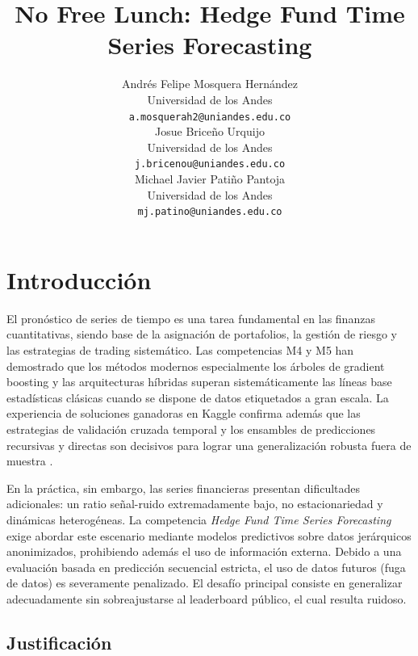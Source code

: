 \documentclass{article}
\title{No Free Lunch: Hedge Fund Time Series Forecasting}
\author{%
  Andrés Felipe Mosquera Hernández \\
  Universidad de los Andes \\
  \texttt{a.mosquerah2@uniandes.edu.co} \\
  \And
  Josue Briceño Urquijo \\
  Universidad de los Andes \\
  \texttt{j.bricenou@uniandes.edu.co} \\
  \And
  Michael Javier Patiño Pantoja \\
  Universidad de los Andes \\
  \texttt{mj.patino@uniandes.edu.co} \\
}
\begin{document}
\maketitle




\section{Introducción}

El pronóstico de series de tiempo es una tarea fundamental en las finanzas cuantitativas, siendo base de la asignación de portafolios, la gestión de riesgo y las estrategias de trading sistemático. Las competencias M4 \citep{makridakis2020m4} y M5 \citep{makridakis2022m5} han demostrado que los métodos modernos especialmente los árboles de gradient boosting \citep{ke2017lightgbm} y las arquitecturas híbridas superan sistemáticamente las líneas base estadísticas clásicas cuando se dispone de datos etiquetados a gran escala. La experiencia de soluciones ganadoras en Kaggle confirma además que las estrategias de validación cruzada temporal y los ensambles de predicciones recursivas y directas son decisivos para lograr una generalización robusta fuera de muestra \citep{m5first2020, kaggleguide}.

En la práctica, sin embargo, las series financieras presentan dificultades adicionales: un ratio señal-ruido extremadamente bajo, no estacionariedad y dinámicas heterogéneas. La competencia \emph{Hedge Fund Time Series Forecasting} \citep{adatacompany2026} exige abordar este escenario mediante modelos predictivos sobre datos jerárquicos anonimizados, prohibiendo además el uso de información externa. Debido a una evaluación basada en predicción secuencial estricta, el uso de datos futuros (fuga de datos) es severamente penalizado. El desafío principal consiste en generalizar adecuadamente sin sobreajustarse al leaderboard público, el cual resulta ruidoso.

\subsection{Justificación}
\end{document}
